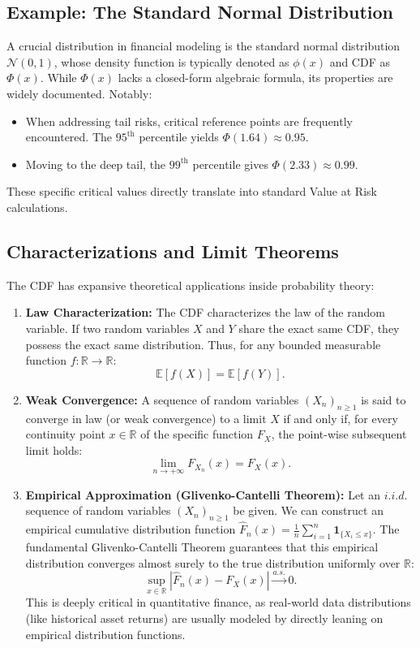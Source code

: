 \subsection*{Example: The Standard Normal Distribution}

A crucial distribution in financial modeling is the standard normal distribution $\mathcal{N}(0, 1)$, whose density function is typically denoted as $\phi(x)$ and CDF as $\Phi(x)$. While $\Phi(x)$ lacks a closed-form algebraic formula, its properties are widely documented. Notably:
\begin{itemize}
    \item When addressing tail risks, critical reference points are frequently encountered. The $95^{\text{th}}$ percentile yields $\Phi(1.64) \approx 0.95$.
    \item Moving to the deep tail, the $99^{\text{th}}$ percentile gives $\Phi(2.33) \approx 0.99$.
\end{itemize}
These specific critical values directly translate into standard Value at Risk calculations.

\subsection{Characterizations and Limit Theorems}

The CDF has expansive theoretical applications inside probability theory:
\begin{enumerate}
    \item \textbf{Law Characterization:} The CDF characterizes the law of the random variable. If two random variables $X$ and $Y$ share the exact same CDF, they possess the exact same distribution. Thus, for any bounded measurable function $f: \mathbb{R} \to \mathbb{R}$:
    $$
    \mathbb{E}[f(X)] = \mathbb{E}[f(Y)].
    $$
    \item \textbf{Weak Convergence:} A sequence of random variables $(X_n)_{n \geq 1}$ is said to converge in law (or weak convergence) to a limit $X$ if and only if, for every continuity point $x \in \mathbb{R}$ of the specific function $F_X$, the point-wise subsequent limit holds:
    $$
    \lim_{n \to +\infty} F_{X_n}(x) = F_X(x).
    $$
    \item \textbf{Empirical Approximation (Glivenko-Cantelli Theorem):} Let an $i.i.d.$ sequence of random variables $(X_n)_{n \geq 1}$ be given. We can construct an empirical cumulative distribution function $\hat{F}_n(x) = \frac{1}{n} \sum_{i=1}^n \mathbf{1}_{\{X_i \leq x\}}$. The fundamental Glivenko-Cantelli Theorem guarantees that this empirical distribution converges almost surely to the true distribution uniformly over $\mathbb{R}$:
    $$
    \sup_{x \in \mathbb{R}} |\hat{F}_n(x) - F_X(x)| \xrightarrow{a.s.} 0.
    $$
    This is deeply critical in quantitative finance, as real-world data distributions (like historical asset returns) are usually modeled by directly leaning on empirical distribution functions.
\end{enumerate}

